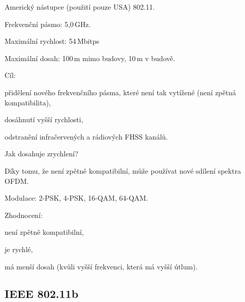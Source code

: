 \begin{compactitem}
    \item Americký nástupce (použití pouze USA) 802.11.

    \item Frekvenční pásmo: 5,0\,GHz.
    \item Maximální rychlost: 54\,Mbitps
    \item Maximální dosah: 100\,m mimo budovy, 10\,m v budově.

    \item Cíl: \begin{compactitem}
        \item přidělení nového frekvenčního pásma, které není tak vytížené (není zpětná kompatibilita),
        \item dosáhnutí vyšší rychlosti,
        \item odstranění infračervených a rádiových FHSS kanálů.
    \end{compactitem}

    \item Jak dosahuje zrychlení? \begin{compactitem}
        \item Díky tomu, že není zpětně kompatibilní, může používat nové sdílení spektra OFDM.
    \end{compactitem}

    \item Modulace: 2-PSK, 4-PSK, 16-QAM, 64-QAM.

    \item Zhodnocení: \begin{compactitem}
        \item není zpětně kompatibilní,
        \item je rychlé,
        \item má menší dosah (kvůli vyšší frekvenci, která má vyšší útlum).
    \end{compactitem}
\end{compactitem}

\subsection{IEEE 802.11b}


